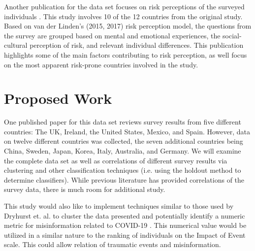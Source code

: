 \documentclass[11pt,sigconf]{acmart}
\begin{document}
Another publication for the data set focuses on risk perceptions of the surveyed individuals \cite{dryhurst}. This study involves 10 of the 12 countries from the original study. Based on van der Linden's (2015, 2017) risk perception model, the questions from the survey are grouped based on mental and emotional experiences, the social-cultural perception of risk, and relevant individual differences. This publication highlights some of the main factors contributing to risk perception, as well focus on the most apparent risk-prone countries involved in the study. 

\section{Proposed Work}

One published paper for this data set reviews survey results from five different countries: The UK, Ireland, the United States, Mexico, and Spain. However, data on twelve different countries was collected, the seven additional countries being China, Sweden, Japan, Korea, Italy, Australia, and Germany. We will examine the complete data set as well as correlations of different survey results via clustering and other classification techniques (i.e. using the holdout method to determine classifiers).
While previous literature has provided correlations of the survey data, there is much room for additional study.

This study would also like to implement techniques similar to those used by Dryhurst et. al. to cluster the data presented and potentially identify a numeric metric for misinformation related to COVID-19 \cite{dryhurst}. This numerical value would be utilized in a similar nature to the ranking of individuals on the Impact of Event scale. This could allow relation of traumatic events and misinformation. %
\end{document}
